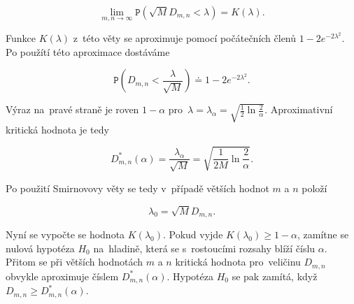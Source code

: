 \documentclass[thesis=B,czech]{FITthesis}[2012/06/26]
\begin{document}
$$\lim_{m,n\rightarrow\infty}\mathtt{P}(\sqrt{M}D_{m,n}<\lambda)=K(\lambda).$$

\noindent Funkce $K(\lambda)$ z~této věty se aproximuje pomocí počátečních členů $1-2e^{-2\lambda^{2}}$. Po použítí této aproximace dostáváme

$$\mathtt{P}\left (D_{m,n}<\frac{\lambda}{\sqrt{M}}\right ) \doteq 1-2e^{-2\lambda^{2}}.$$

\noindent Výraz na~pravé straně je roven $1-\alpha$ pro~$\lambda=\lambda_{\alpha}=\sqrt{\frac{1}{2}\ln{\frac{2}{\alpha}}}$. Aproximativní kritická hodnota je tedy 

$$D^{*}_{m,n}(\alpha)=\frac{\lambda_{\alpha}}{\sqrt{M}}=\sqrt{\frac{1}{2M}\ln{\frac{2}{\alpha}}}.$$

\noindent Po použití Smirnovovy věty se tedy v~případě větších hodnot $m$ a $n$ položí

$$\lambda_{0}=\sqrt{M}D_{m,n}.$$

\noindent Nyní se vypočte se hodnota $K(\lambda_{0})$. Pokud vyjde $K(\lambda_{0})\geq 1-\alpha$, zamítne se nulová hypotéza $H_{0}$ na~hladině, která se s~rostoucími rozsahy blíží číslu $\alpha$. Přitom se při větších hodnotách $m$ a $n$ kritická hodnota pro~veličinu $D_{m,n}$ obvykle aproximuje číslem $D^{*}_{m,n}(\alpha)$. Hypotéza $H_{0}$ se pak zamítá, když $D_{m,n}\geq D^{*}_{m,n}(\alpha)$.






\end{document}

